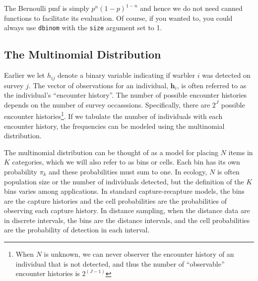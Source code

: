 The Bernoulli pmf is simply $p^n(1-p)^{1-n}$ and hence we do not need canned
functions to facilitate its evaluation. Of course, if you wanted to, you
could always use \verb+dbinom+ with the \verb+size+ argument set to
1.

\subsection{The Multinomial Distribution}


Earlier we let $h_{ij}$ denote a binary variable indicating if
warbler $i$ was detected on survey $j$. The vector of observations for an
individual, $\mathbf{h}_i$, is often referred to as the individual's
``encounter history''. The number of possible encounter
histories depends on the number of survey occasssions. Specifically,
there are $2^J$
possible encounter histories\footnote{When $N$ is unknown, we can
  never observer the encounter history of an individual that is not
  detected, and thus the number of ``observable'' encounter histories
  is $2^(J-1)$}.
If we tabulate the number of individuals with each encounter history,
the frequencies can be modeled using the multinomial
distribution.

The multinomial distribution can be thought of as a
model for placing $N$ items in $K$
categories, which we will also refer to as bins or cells. Each bin has
its own probability $\pi_k$ and
these probabilities must sum to one.
In ecology, $N$ is often population size or the number of individuals
detected, but the definition of the $K$ bins varies among
applications. In standard capture-recapture models, the bins are the
capture histories and the cell probabilities are the probabilities of
observing each capture history. In
distance sampling, when the distance data are in discrete intervals,
the bins are the distance intervals, and the cell probabilities are
the probability of detection in each interval.

